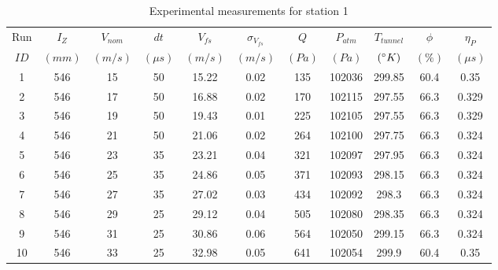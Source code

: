 \renewcommand\baselinestretch{1.3}\selectfont
\begin{table}[H]
\begin{center}
\begin{tabular}{|ccccccccccc|}
	\hline
	Run & $I_Z$ & $V_{nom}$ & $dt$ & $V_{fs}$ & $\sigma_{V_{fs}}$ & $Q$ & $P_{atm}$ & $T_{tunnel}$ & $\phi$ & $\eta_P$\\
	$ID$ & $(mm)$ & $(m/s)$ & $(\mu s)$ & $(m/s)$ & $(m/s)$ & $(Pa)$ & $(Pa)$ & $(\degree K)$ & $(\%)$ & $(\mu s)$\\
	\hline
	1 & 546 & 15 & 50 & 15.22 & 0.02 & 135 & 102036 & 299.85 & 60.4 & 0.35\\
	2 & 546 & 17 & 50 & 16.88 & 0.02 & 170 & 102115 & 297.55 & 66.3 & 0.329\\
	3 & 546 & 19 & 50 & 19.43 & 0.01 & 225 & 102105 & 297.55 & 66.3 & 0.329\\
	4 & 546 & 21 & 50 & 21.06 & 0.02 & 264 & 102100 & 297.75 & 66.3 & 0.324\\
	5 & 546 & 23 & 35 & 23.21 & 0.04 & 321 & 102097 & 297.95 & 66.3 & 0.324\\
	6 & 546 & 25 & 35 & 24.86 & 0.05 & 371 & 102093 & 298.15 & 66.3 & 0.324\\
	7 & 546 & 27 & 35 & 27.02 & 0.03 & 434 & 102092 & 298.3 & 66.3 & 0.324\\
	8 & 546 & 29 & 25 & 29.12 & 0.04 & 505 & 102080 & 298.35 & 66.3 & 0.324\\
	9 & 546 & 31 & 25 & 30.86 & 0.06 & 564 & 102050 & 299.15 & 66.3 & 0.324\\
	10 & 546 & 33 & 25 & 32.98 & 0.05 & 641 & 102054 & 299.9 & 60.4 & 0.35\\
	\hline
\end{tabular}
\caption{Experimental measurements for station 1}
\label{table:station_1_measurements}
\end{center}
\end{table}
\renewcommand\baselinestretch{2}\selectfont
